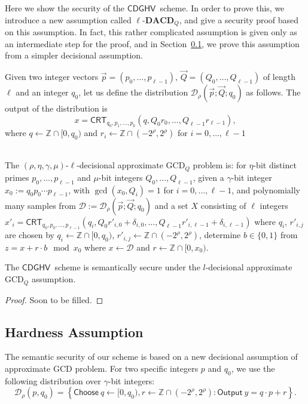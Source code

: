 \documentclass[11pt]{llncs}
\newcommand{\Z}{{\mathbb Z}}
\newcommand*\Choose{\ensuremath{\mathsf{Choose}\ }}
\newcommand*\Output{\ensuremath{\mathsf{Output}\ }}
\newcommand*{\crt}{\ensuremath{\mathsf{CRT}}}
\newcommand*{\CDGHV}{\ensuremath{\mathsf{CDGHV}}}
\newcommand*\D{\ensuremath{\mathcal D}}
\begin{document}
Here we show the security of the \CDGHV\ scheme.  In order to prove this, we introduce a new assumption called $\ell$-$\mathbf{DACD}_Q$, and give a security proof based on this assumption.  In fact, this rather complicated assumption is given only as an intermediate step for the proof, and in Section~\ref{decisional_assumption}, we prove this assumption from a simpler decisional assumption.

Given two integer vectors $\vec{p}=(p_0, \dots, p_{\ell-1})$, $\vec{Q}=(Q_0, \dots, Q_{\ell-1})$ of length $\ell$ and an integer $q_0$, let us define the distribution $\D_\rho(\vec{p}; \vec{Q}; q_0)$ as follows.  The output of the distribution is
\[
x=\crt_{q_0,p_1,\dots,p_k}(q,Q_0r_0,\dots,Q_{\ell-1}r_{\ell-1}),
\]
where $q\gets\Z\cap[0,q_0)$ and $r_i\gets\Z\cap(-2^\rho,2^\rho)$ for $i=0,\dots,\ell-1$

\begin{definition} \\
The $(\rho,\eta,\gamma,\mu)$-$\ell$-decisional approximate GCD$_Q$ problem is: for $\eta$-bit distinct primes $p_0,\dots,p_{\ell-1}$ and $\mu$-bit integers $Q_0,\dots,Q_{\ell-1}$, given a $\gamma$-bit integer  $x_0:=q_0p_0\cdots p_{\ell-1}$, with $\gcd(x_0,Q_i)=1$ for $i=0,\dots,\ell-1$, and  %
polynomially many samples from $\D:=\D_{\rho}(\vec{p};\vec{Q};q_0)$ and a set $X$ consisting of $\ell$ integers $x'_i=\crt_{q_0,p_0,\dots,p_{\ell-1}}(q_i,Q_0r'_{i,0}+\delta_{i,0},\dots,Q_{\ell-1}r'_{i,\ell-1}+\delta_{i,\ell-1})$ where $q_i$, $r'_{i,j}$ are chosen by
$q_i\gets\Z\cap[0,q_0)$, $r'_{i,j}\gets\Z\cap(-2^\rho,2^\rho)$, determine $b\in\{0,1\}$ from $z=x+r\cdot b\mod x_0$ where $x\gets\D$ and $r\gets\Z\cap[0,x_0)$.
\end{definition}

\begin{theorem}
The \CDGHV\ scheme is semantically secure under the $l$-decisional approximate $\mathrm{GCD}_Q$ assumption.
\end{theorem}
\begin{proof}
Soon to be filled.
\end{proof}

\subsection{Hardness Assumption}\label{decisional_assumption}
The semantic security of our scheme is based on a new decisional assumption of approximate GCD problem. 
 For two specific
integers $p$ and $q_0$, we use the following distribution over
$\gamma$-bit integers:  
\[ \D_\rho(p,q_0) = \left\{ \Choose q\gets [0, q_0),
  r\gets \Z\cap (-2^\rho, 2^\rho) : \Output y=q\cdot p+r
  \right\}. \] 
\end{document}
